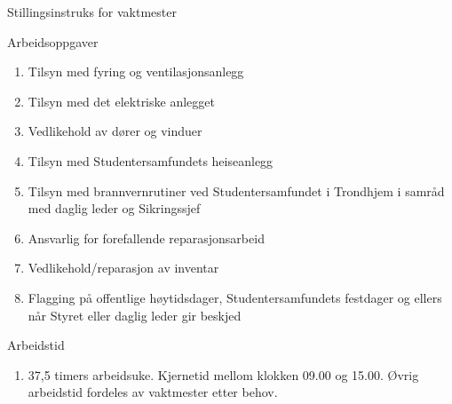 \begin{instruks*}{Stillingsinstruks for vaktmester}
    \begin{instruksledd}{Arbeidsoppgaver}
        \begin{enumerate}
            \item Tilsyn med fyring og ventilasjonsanlegg
            \item Tilsyn med det elektriske anlegget
            \item Vedlikehold av dører og vinduer
            \item Tilsyn med Studentersamfundets heiseanlegg
            \item Tilsyn med brannvernrutiner ved Studentersamfundet i Trondhjem i samråd med daglig leder og Sikringssjef
            \item Ansvarlig for forefallende reparasjonsarbeid
            \item Vedlikehold/reparasjon av inventar
            \item Flagging på offentlige høytidsdager, Studentersamfundets festdager og ellers når Styret eller daglig leder gir
                beskjed   
        \end{enumerate}
    \end{instruksledd}

    \begin{instruksledd}{Arbeidstid}
        \begin{enumerate}
            \item 37,5 timers arbeidsuke. Kjernetid mellom klokken 09.00 og 15.00. Øvrig arbeidstid fordeles av vaktmester
                etter behov. 
        \end{enumerate}
    \end{instruksledd}

\end{instruks*}



